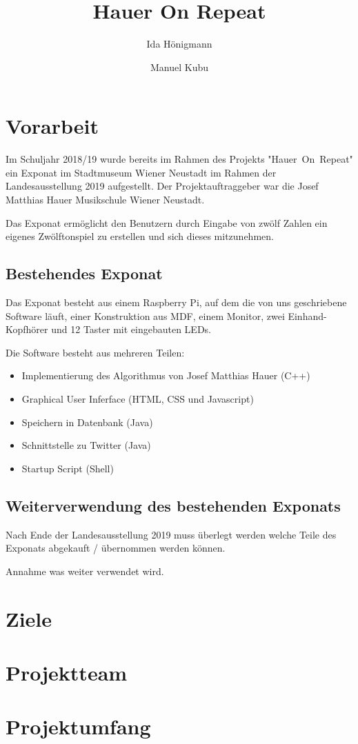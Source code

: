 \documentclass[]{article}
\title{Hauer On Repeat}
\author{Ida Hönigmann \and Manuel Kubu}
\begin{document}
\maketitle
\newpage
\tableofcontents
\newpage

\section{Vorarbeit}
Im Schuljahr 2018/19 wurde bereits im Rahmen des Projekts \mbox{"Hauer On Repeat"} ein Exponat im Stadtmuseum Wiener Neustadt im Rahmen der Landesausstellung 2019 aufgestellt. Der Projektauftraggeber war die Josef Matthias Hauer Musikschule Wiener Neustadt.

Das Exponat ermöglicht den Benutzern durch Eingabe von zwölf Zahlen ein eigenes Zwölftonspiel zu erstellen und sich dieses mitzunehmen.

\subsection{Bestehendes Exponat}
Das Exponat besteht aus einem Raspberry Pi, auf dem die von uns geschriebene Software läuft, einer Konstruktion aus MDF, einem Monitor, zwei Einhand-Kopfhörer und 12 Taster mit eingebauten LEDs.

Die Software besteht aus mehreren Teilen:
\begin{itemize}
	\item Implementierung des Algorithmus von Josef Matthias Hauer (C++)
	\item Graphical User Inferface (HTML, CSS und Javascript)
	\item Speichern in Datenbank (Java)
	\item Schnittstelle zu Twitter (Java)
	\item Startup Script (Shell)
\end{itemize}

\subsection{Weiterverwendung des bestehenden Exponats}
Nach Ende der Landesausstellung 2019 muss überlegt werden welche Teile des Exponats abgekauft / übernommen werden können.

Annahme was weiter verwendet wird.

\section{Ziele}

\section{Projektteam}

\section{Projektumfang}
\end{document}
